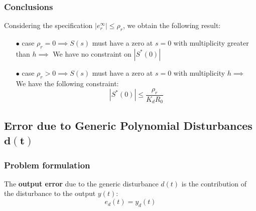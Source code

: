 \documentclass{article}
\numberwithin{equation}{subsection}
\begin{document}
	\subsubsection{Conclusions}
	Considering the specification $\left|e_r^\infty\right| \leq \rho_r  $, we obtain the following result:
	\begin{enumerate}
		\item[$\bullet$] case $\rho_r=0 \implies S(s)$ must have a zero at $s=0$ with multiplicity greater than $h \implies$ We have no constraint on $\left|S^*(0)\right| $ 
		\item[$\bullet$] case $\rho_r>0 \implies S(s)$ must have a zero at $s=0$ with multiplicity $h \implies$ We have the following constraint:
		\begin{equation}
			\left|S^*(0)\right| \leq \dfrac{\rho_r}{K_dR_0}	
		\end{equation}
	\end{enumerate}
	
	\subsection{Error due to Generic Polynomial Disturbances $\bm{d(t)}$}
	\subsubsection{Problem formulation}
	The \textbf{output error} due to the generic disturbance $d(t)$ is the contribution of the disturbance to the output $y(t)$:
	\begin{equation}
		e_d(t) = y_d(t)
	\end{equation}
	
\end{document}
